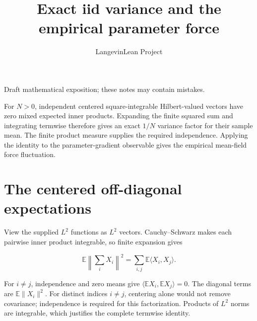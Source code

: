 \documentclass[11pt,a4paper]{article}
\title{\texorpdfstring{Exact iid variance and the empirical parameter force}{Exact iid variance and the empirical parameter force}}
\author{LangevinLean Project}
\date{}
\begin{document}
\maketitle
Draft mathematical exposition; these notes may contain mistakes.


For \(N>0\), independent centered square-integrable Hilbert-valued vectors have zero mixed expected inner products. Expanding the finite squared sum and integrating termwise therefore gives an exact \(1/N\) variance factor for their sample mean. The finite product measure supplies the required independence. Applying the identity to the parameter-gradient observable gives the empirical mean-field force fluctuation.


\section{\texorpdfstring{The centered off-diagonal expectations}{The centered off-diagonal expectations}}


View the supplied \(L^2\) functions as \(L^2\) vectors. Cauchy–Schwarz makes each pairwise inner product integrable, so finite expansion gives

\[\mathbb E\left\|\sum_iX_i\right\|^2=\sum_{i,j}\mathbb E\langle X_i,X_j\rangle.\]

For \(i\ne j\), independence and zero means give \(\langle\mathbb E X_i,\mathbb E X_j\rangle=0\). The diagonal terms are \(\mathbb E\|X_i\|^2\). For distinct indices \(i\ne j\), centering alone would not remove covariance; independence is required for this factorization. Products of \(L^2\) norms are integrable, which justifies the complete termwise identity.
\end{document}
